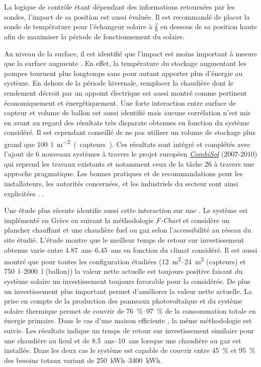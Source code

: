 La logique de contrôle étant dépendant des informations retournées par les sondes,
l’impact de sa position est aussi évaluée. Il est recommandé de placer la sonde
de température pour l’échangeur solaire à $\frac{2}{6}$ en dessous de sa position haute
afin de maximiser la période de fonctionnement du solaire.

Au niveau de la surface, il est identifié que l’impact est moins important à mesure
que la surface augmente \parencite{Task26C2007}. En effet, la température du stockage augmentant les pompes
tournent plus longtemps sans pour autant apporter plus d’énergie au système. En dehors
de la période hivernale, remplacer la chaudière dont le rendement décroit par un appoint
électrique est aussi montré comme pertinent économiquement et énergétiquement.
Une forte interaction entre surface de capteur et volume de ballon est aussi identifié
mais aucune corrélation n’est mis en avant au regard des résultats très disparate
obtenues en fonction du système considéré. Il est cependant conseillé de ne pas utiliser
un volume de stockage plus grand que \SI{100}{\litre\per\metre\squared (capteurs)}.
Ces résultats sont intégré et complétés avec l’ajout de $6$ nouveaux systèmes à travers
le projet européen \href{http://www.combisol.eu/}{\textit{CombiSol}} ($2007$-$2010$) qui reprend
les travaux existants et notamment ceux de la tâche $26$ à travers une approche pragmatique.
Les bonnes pratiques et de recommandations pour les installateurs, les autorités concernées,
et les industriels du secteur sont ainsi explicitées \parencite{Thuer2011}.
.

Une étude plus récente \textcite{Tsalikis2015743} identifie aussi cette interaction
sur une . Le système est implémenté en Grèce en suivant
la méthodologie \textit{F-Chart} et considère un plancher chauffant et une chaudière
fuel ou gaz selon l’accessibilité au réseau du site étudié.
L’étude montre que le meilleur temps de retour sur investissement obtenue varie entre
\SIrange{4.87}{6.45}{ans} en fonction du climat considéré. Il est aussi montré que pour toutes les
configuration étudiées (\SIrange{12}{24}{\metre\squared} (capteurs) et \SIrange{750}{2000}{\litre} (ballon))
la valeur nette actuelle est toujours positive faisant du système solaire un investissement toujours favorable
pour la  considérée. De plus un investissement plus important
permet d’améliorer la valeur nette actuelle. La prise en compte de la production
des panneaux photovoltaïque et du système solaire thermique permet de couvrir de
\SIrange{76}{97}{\percent} de la consommation totale en énergie primaire.
Dans le cas d’une maison efficiente \parencite{Martinopoulos2014130}, la même méthodologie
est suivie. Les résultats indique un temps de retour sur investissement similaire pour
une chaudière au fioul et de \SIrange{8.5}{10}{ans} lorsque une chaudière au gaz
est installée.
Dans les deux cas le système est capable de couvrir entre \SI{45}{\percent} et \SI{95}{\percent}
des besoins totaux variant de \SIrange{250}{3400}{kWh}.



